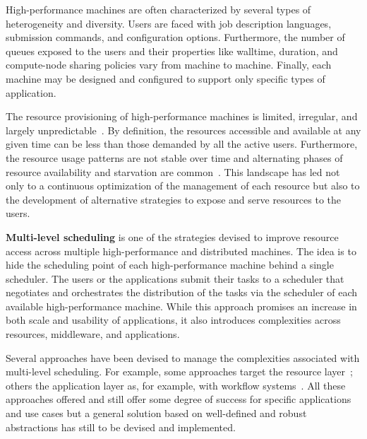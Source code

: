 \documentclass{sig-alternate}
\begin{document}
High-performance machines are often characterized by several types of
heterogeneity and diversity. Users are faced with job description languages,
submission commands, and configuration options. Furthermore, the number of
queues exposed to the users and their properties like walltime, duration, and
compute-node sharing policies vary from machine to machine. Finally, each
machine may be designed and configured to support only specific types of
application.

The resource provisioning of high-performance machines is limited, irregular,
and largely unpredictable~\cite{downey1997,wolski2003,li2004,tsafrir2007}. By
definition, the resources accessible and available at any given time can be less
than those demanded by all the active users. Furthermore, the resource usage
patterns are not stable over time and alternating phases of resource
availability and starvation are common~\cite{Furlani2013,Lu2013}. This landscape
has led not only to a continuous optimization of the management of each resource
but also to the development of alternative strategies to expose and serve
resources to the users.


{\bf Multi-level scheduling} is one of the strategies devised to improve
resource access across multiple high-performance and distributed machines. The
idea is to hide the scheduling point of each high-performance machine behind a
single scheduler. The users or the applications submit their tasks to a
scheduler that negotiates and orchestrates the distribution of the tasks via the
scheduler of each available high-performance machine. While this approach
promises an increase in both scale and usability of applications, it also
introduces complexities across resources, middleware, and applications.


Several approaches have been devised to manage the complexities associated with
multi-level scheduling. For example, some approaches target the resource
layer~\cite{raicu2007falkon,singh2005,ramakrishnan2006toward,foster2008,juve2008,villegas2012,song2009};
others the application layer as, for example, with workflow
systems~\cite{taylor2014,curcin2008scientific,juve2008,balderrama2012scalable}.
All these approaches offered and still offer some degree of success for specific
applications and use cases but a general solution based on well-defined and
robust abstractions has still to be devised and implemented.
\end{document}
